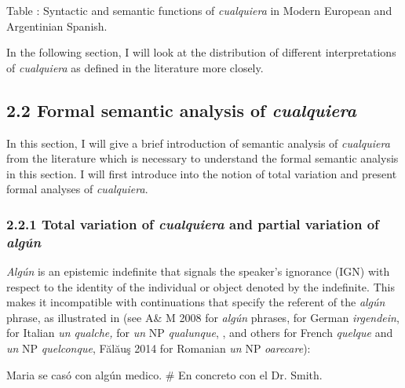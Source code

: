 \documentclass[output=paper]{langscibook}
\begin{document}
\begin{styletablecaption}
Table : Syntactic and semantic functions of \textit{cualquiera} in Modern European and Argentinian Spanish.
\end{styletablecaption}

In the following section, I will look at the distribution of different interpretations of \textit{cualquiera} as defined in the literature more closely.

\subsection{\textbf{2.2} \textbf{Formal} \textbf{semantic} \textbf{analysis} \textbf{of} \textbf{\textit{cualquiera}}}

In this section, I will give a brief introduction of semantic analysis of \textit{cualquiera} from the literature which is necessary to understand the formal semantic analysis in this section. I will first introduce into the notion of total variation and present formal analyses of \textit{cualquiera}. 

\subsubsection{\textbf{2.2.1} \textbf{Total} \textbf{variation} \textbf{of} \textbf{\textit{cualquiera}} \textbf{and} \textbf{partial} \textbf{variation} \textbf{of} \textbf{\textit{algún}} }

\textit{Algún} is an epistemic indefinite that signals the speaker’s ignorance (IGN) with respect to the identity of the individual or object denoted by the indefinite. This makes it incompatible with continuations that specify the referent of the \textit{algún} phrase, as illustrated in  (see A\& M 2008 for \textit{algún} phrases, \citealt{KratzerShimoyama2002} for German \textit{irgendein}, \citealt{AloniPort2013} for Italian \textit{un qualche,} \citealt{Chierchia2006} for \textit{un} NP \textit{qualunque}, \citealt{JayezTovena2007}, and others for French \textit{quelque} and \textit{un} NP \textit{quelconque}, Fălăuş 2014 for Romanian \textit{un} NP \textit{oarecare}):

\label{bkm:Ref533761877}  Maria se casó con algún medico. \# En concreto con el Dr. Smith.
\end{document}

